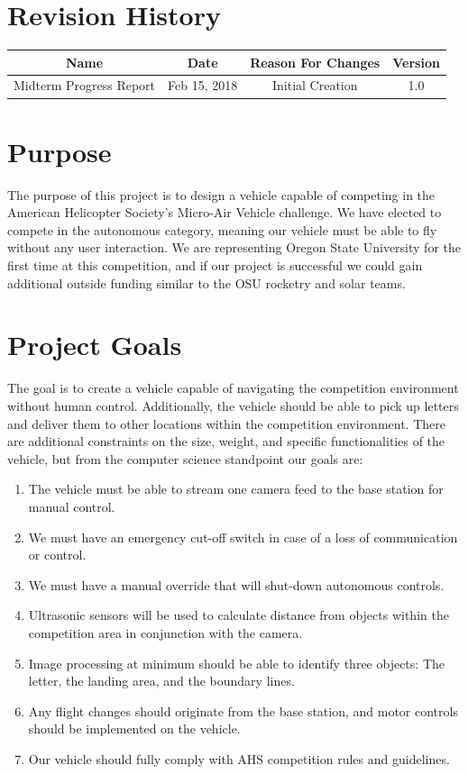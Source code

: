 \documentclass[onecolumn, draftclsnofoot,10pt, compsoc]{IEEEtran}
\begin{document}
\section*{Revision History}

\begin{center}
    \begin{tabular}{|c|c|c|c|}
        \hline
		Name & Date & Reason For Changes & Version\\
        \hline
		Midterm Progress Report & Feb 15, 2018 & Initial Creation & 1.0\\
		\hline
    \end{tabular}
\end{center}




\section{Purpose}

The purpose of this project is to design a vehicle capable of competing in the American Helicopter Society’s Micro-Air Vehicle challenge. We have elected to compete in the autonomous category, meaning our vehicle must be able to fly without any user interaction. We are representing Oregon State University for the first time at this competition, and if our project is successful we could gain additional outside funding similar to the OSU rocketry and solar teams.

\section{Project Goals}
The goal is to create a vehicle capable of navigating the competition environment without human control. Additionally, the vehicle should be able to pick up letters and deliver them to other locations within the competition environment. There are additional constraints on the size, weight, and specific functionalities of the vehicle, but from the computer science standpoint our goals are:

\begin{enumerate}
\item{The vehicle must be able to stream one camera feed to the base station for manual control. }
\item{We must have an emergency cut-off switch in case of a loss of communication or control. }
\item{We must have a manual override that will shut-down autonomous controls.}
\item{Ultrasonic sensors will be used to calculate distance from objects within the competition area in conjunction with the camera.}
\item{Image processing at minimum should be able to identify three objects: The letter, the landing area, and the boundary lines.}
\item{Any flight changes should originate from the base station, and motor controls should be implemented on the vehicle.}
\item{Our vehicle should fully comply with AHS competition rules and guidelines. }
\end{enumerate}
\end{document}
